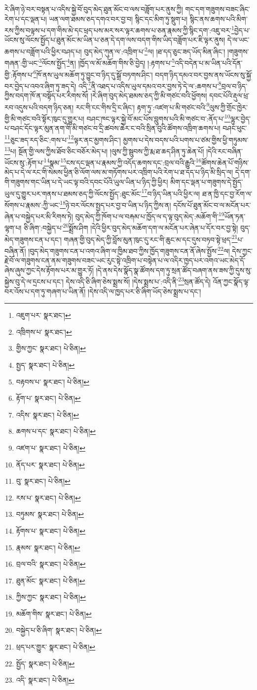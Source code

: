 རེ་ཞིག་ཉེ་བར་བསྟན་པ་འདིས་སྐྱེ་བོ་བུད་མེད་ཐུན་མོང་བ་ལས་བཟློག་པར་ནུས་ཀྱི། གང་དག་གཟུགས་བཟང་ཞིང་རེག་པ་དང་ལྡན་པ། ཡན་ལག་ཐམས་ཅད་དགའ་བར་བྱ་བ། སྙིང་དང་མིག་ཏུ་སྡུག་པ། སྙིང་ནས་ཆགས་པའི་མིག་རས་ཀྱིས་བལྟས་པ་དག་གིས་མེ་དང་ཕྲད་པས་མར་སར་ལྟར་ཆགས་པ་ཅན་རྣམས་ཀྱི་སྙིང་དག་:འཇུ་བར་\footnote{འཇུག་པར་  སྣར་ཐང་། }བྱེད་པ་ཡོངས་སུ་ལོངས་སྤྱོད་པ་ཐུན་མོང་མ་ཡིན་པ་ཅན་དེ་དག་ལས་བདག་གིས་ཡིད་བཟློག་པར་ཇི་ལྟར་ནུས། དེ་ལ་ཡང་ཆགས་པ་བཟློག་པའི་ཕྱིར་བཤད་པ། བུད་མེད་ཀུན་ལ་:འཁྲིག་པ་\footnote{འཁྲིགས་པ་  སྣར་ཐང་། }ལ། །ཐ་དད་ཅུང་ཟད་ཡོད་མིན་ཞིང་། །གཟུགས་གཞན་:གྱི་ཡང་\footnote{གྱིས་ཀྱང་  སྣར་ཐང་།  པེ་ཅིན། }ལོངས་སྤྱོད་\footnote{སྤྱད་  སྣར་ཐང་།  པེ་ཅིན། }ན། །ཁྱོད་ལ་མོ་མཆོག་གིས་ཅི་བྱེད། །:རྟགས་པ་\footnote{བརྟབས་པ་  སྣར་ཐང་།  པེ་ཅིན། }འདི་བདེན་པ་མ་ཡིན་པའི་དོན་གྱི་:རྟོགས་པ་\footnote{རྟོག་པ་  སྣར་ཐང་།  པེ་ཅིན། }ཁོ་ནས་ཡུལ་མཆོག་ཏུ་བྱུང་བ་ཉིད་དུ་སྒྲོ་བཏགས་ཤིང་། བདག་ཉིད་དམའ་བར་བྱས་ནས་ཡོངས་སུ་སྐྱོ་བར་བྱེད་པ་འབའ་ཞིག་ཏུ་ཟད་དེ། འདི་\footnote{འདིས་  སྣར་ཐང་།  པེ་ཅིན། }ནི་འཐད་པ་འདིས་ཡུལ་དམའ་བར་བྱས་ཏེ་དེ་ལ་:ཆགས་པ་\footnote{ཆགས་པ་དང་  སྣར་ཐང་།  པེ་ཅིན། }བྲལ་བ་ཉིད་ཀྱིས་བདག་ཁོ་ན་བསྟོད་པར་རིགས་སོ། །རེ་ཞིག་བུད་མེད་ཐམས་ཅད་ཀྱི་མི་གཙང་བའི་ཕྱོགས། དབང་པོའི་རྡུལ་ཕྲ་རབ་འདུས་པའི་བདག་ཉིད་ཅན། རང་གི་ངང་གིས་དྲི་ང་ཞིང་། རྟག་ཏུ་:འཛག་པ་མི་གཙང་བའི་\footnote{འཛག་པ་  སྣར་ཐང་།  པེ་ཅིན། }ལུས་ཀྱི་གྲོང་ཁྱེར་གྱི་མི་གཙང་བའི་སྟོར་ཁུང་དུ་གྱུར་པ། བཤང་ཁང་ལྟར་སྐྱེ་བོ་མང་པོས་བླུགས་པའི་མི་གཙང་བ་:ནོད་པ་\footnote{ནོད་པར་  སྣར་ཐང་།  པེ་ཅིན། }ལྷུར་བྱེད་པ་བཤང་དོང་ལྟར་མུན་ནག་གི་མི་གཙང་བ་དྲི་ཚབས་ཆེར་ང་བའི་སྲིན་བུའི་ཚོགས་འཁྲིག་ཆགས་པ། བཤང་ཕུང་\footnote{བུ་  སྣར་ཐང་།  པེ་ཅིན། }ཅུང་ཟད་རད་ཅིང་:གས་པ་\footnote{རས་པ་  སྣར་ཐང་།  པེ་ཅིན། }ལྟར་ནང་མྱགས་ཤིང་། མྱགས་པ་དེས་བདས་པའི་པགས་པ་ཙམ་གྱིས་ཕྱི་གཏུམས་\footnote{བཏུམས་  སྣར་ཐང་།  པེ་ཅིན། }པ། སྔོན་གྱི་ལས་ཀྱིས་ཐོབ་ཅིང་བཅོར་མེད་པ། །ལུས་ཀྱི་སྦུབས་ཀྱི་རྨ་ཐ་ཆད་ཤིན་ཏུ་ཆེན་པོ། །དེའི་རང་བཞིན་ཡོངས་སུ་:རྟོག་པ་\footnote{རྟོགས་པ་  སྣར་ཐང་།  པེ་ཅིན། }སྣམ་\footnote{རྣམས་  སྣར་ཐང་།  པེ་ཅིན། }ངས་དང་ལྡན་པ་རྣམས་ཀྱི་འདོད་ཆགས་དང་:བྲལ་བའི་རྒྱུའི་\footnote{བྲལ་བའི་  སྣར་ཐང་།  པེ་ཅིན། }ཚོགས་ཆེན་པོ་གཉིས་མེད་པ་དེ་ལ་རང་གི་སེམས་ཕྱིན་ཅི་ལོག་ལས་མ་གཏོགས་པར་འཁྲིག་པའི་རེག་པ་ཐ་དད་པ་ཉིད་མི་སྲིད་ལ། དེ་དག་གི་གཟུགས་གང་ཡིན་པ་དེ་ཡང་ལྟ་བའི་དབང་པོའི་ཡུལ་ཡིན་པ་ཉིད་ཀྱི་ཕྱིར། མིག་དང་ལྡན་པ་གཟུགས་དེ་སྤྱོད་ཡུལ་དུ་གྱུར་པར་གནས་པ་ཐམས་ཅད་ཀྱི་ལོངས་སྤྱོད་:ཐུང་མོང་\footnote{ཐུན་མོང་  སྣར་ཐང་།  པེ་ཅིན། }བ་ཉིད་ཡིན་པའི་ཕྱིར་ལ། ཐ་ན་ཁྱི་དང་བྱ་རོག་ལ་སོགས་པ་རྣམས་:ཀྱི་ཡང་\footnote{ཀྱིས་ཀྱང་  སྣར་ཐང་།  པེ་ཅིན། }ཉེ་བར་ལོངས་སྤྱད་པར་བྱ་བ་ཡིན་པ་ཉིད་ཀྱིས་ན། དངོས་པོ་ཐུན་མོང་བ་ལ་མངོན་པར་ཞེན་པ་བསྐྱེད་པར་མི་རིགས་ཏེ། བུད་མེད་ཀྱི་ཁོག་པ་ལ་བརྐམ་པ་ཁྱོད་ལ་ད་ལྟ་བུད་མེད་:མཆོག་གི་\footnote{མཆོག་གིས་  སྣར་ཐང་།  པེ་ཅིན། }ཡོན་ཏན་ལྷག་པ། ཅི་ཞིག་:བསྐྱེད་པ་\footnote{བསྐྱེད་པ་ཅི་ཞིག་  སྣར་ཐང་།  པེ་ཅིན། }སྨྲོས་ཤིག །དེའི་ཕྱིར་བུད་མེད་མཆོག་དག་ལ་མངོན་པར་ཞེན་པ་དོར་བར་བྱ་སྟེ། བུད་མེད་གཟུགས་ངན་པ་དང་། གཞན་གྱི་བུད་མེད་ཀྱི་བློས་མུན་ཁུང་དུ་རང་གི་ཆུང་མ་དང་དུས་བཏབ་སྟེ་ཕྲད་\footnote{ཕྲད་པར་གྱུར་  སྣར་ཐང་།  པེ་ཅིན། }པ་བཞིན་ནོ། །བུད་མེད་གཟུགས་ངན་པ་འགའ་ཞིག་ལ་ཁྱིམ་ཐབ་ཀྱིས་ཁྱོད་གཟུགས་ངན་ནོ་ཞེས་སྤྱོས་\footnote{སྤྱོད་  སྣར་ཐང་།  པེ་ཅིན། }ལ། དེས་ཀྱང་རྗེ་བོ་ལ་གཟུགས་ངན་ནམ་གཟུགས་བཟང་ཡང་རུང་སྟེ་འཁྲིག་པ་བསྟེན་པ་ལ་འདིར་ཁྱད་པར་འགའ་ཡང་མེད་དོ་ཞེས་ཞུས་ཀྱང་དེས་རྟོགས་པར་མ་གྱུར་ཏོ། །དེ་ནས་དེས་སྣོད་སྣ་ཚོགས་དག་ཏུ་སྲན་ཚོད་བཞག་ནས་ཟས་ཀྱི་དུས་སུ་སྐྱེས་བུ་དེ་ལ་དྲངས་པ་དང་། དེས་འདི་ཅི་ཞིག་ཅེས་སྨྲས་སོ། །དེས་སྨྲས་པ་:འདི་ནི་\footnote{འདི་  སྣར་ཐང་།  པེ་ཅིན། }སྲན་ཚོད་དེ། འོན་ཀྱང་སྣོད་ལྟ་བར་འོས་པ་དག་ཏུ་གཞག་པ་ཡིན་ནོ། །དེས་འདི་ལ་ཁྱད་པར་ཅི་ཞིག་ཡོད་ཅེས་སྨྲས་པ་དང་། 